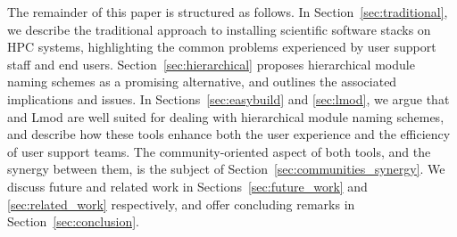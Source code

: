 The remainder of this paper is structured as follows. In Section~\ref{sec:traditional},
we describe the traditional approach to installing scientific software stacks on HPC
systems, highlighting the common problems experienced by user support staff and end
users. Section~\ref{sec:hierarchical} proposes hierarchical module naming schemes as a 
promising alternative, and outlines the associated implications and issues. In
Sections~\ref{sec:easybuild} and \ref{sec:lmod}, we argue that \easybuild{} and Lmod
are well suited  for dealing with hierarchical module naming schemes, and describe how 
these tools enhance both the user experience and the efficiency of user support teams.
The community-oriented aspect of both tools, and the synergy between them, is the
subject of Section~\ref{sec:communities_synergy}. We discuss future and related work in
Sections~\ref{sec:future_work} and \ref{sec:related_work} respectively, and offer
concluding remarks in  Section~\ref{sec:conclusion}.

